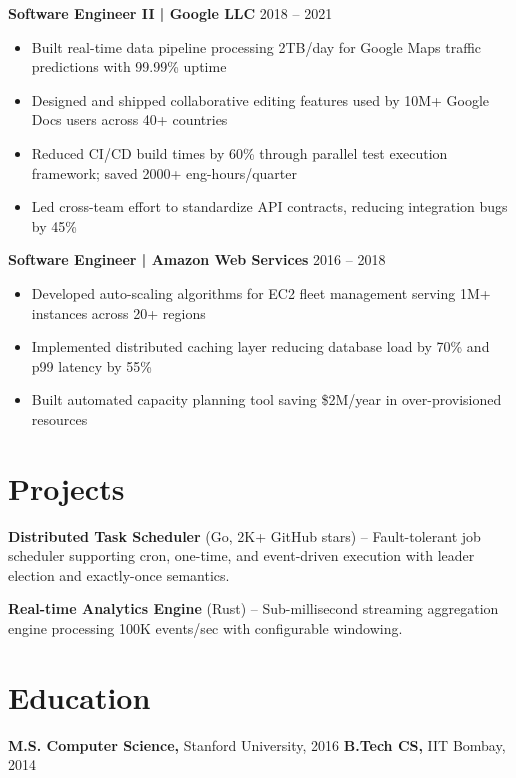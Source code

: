 \documentclass[9pt,letterpaper]{article}
\begin{document}
\vspace{2pt}
\textbf{Software Engineer II | Google LLC} \hfill 2018 -- 2021
\begin{itemize}[leftmargin=1em, topsep=1pt, itemsep=0pt, parsep=0pt]
  \item Built real-time data pipeline processing 2TB/day for Google Maps traffic predictions with 99.99\% uptime
  \item Designed and shipped collaborative editing features used by 10M+ Google Docs users across 40+ countries
  \item Reduced CI/CD build times by 60\% through parallel test execution framework; saved 2000+ eng-hours/quarter
  \item Led cross-team effort to standardize API contracts, reducing integration bugs by 45\%
\end{itemize}

\vspace{2pt}
\textbf{Software Engineer | Amazon Web Services} \hfill 2016 -- 2018
\begin{itemize}[leftmargin=1em, topsep=1pt, itemsep=0pt, parsep=0pt]
  \item Developed auto-scaling algorithms for EC2 fleet management serving 1M+ instances across 20+ regions
  \item Implemented distributed caching layer reducing database load by 70\% and p99 latency by 55\%
  \item Built automated capacity planning tool saving \$2M/year in over-provisioned resources
\end{itemize}

\section{Projects}

\textbf{Distributed Task Scheduler} (Go, 2K+ GitHub stars) -- Fault-tolerant job scheduler supporting cron, one-time, and event-driven execution with leader election and exactly-once semantics.

\textbf{Real-time Analytics Engine} (Rust) -- Sub-millisecond streaming aggregation engine processing 100K events/sec with configurable windowing.

\section{Education}

\textbf{M.S. Computer Science,} Stanford University, 2016 \hfill \textbf{B.Tech CS,} IIT Bombay, 2014
\end{document}
